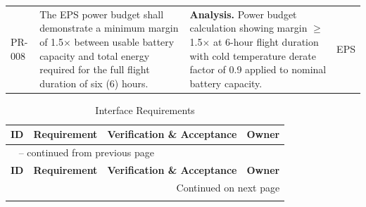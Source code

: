 \begin{landscape}
\begin{longtable}{p{1.4cm}p{8.2cm}p{10.2cm}p{1.9cm}}
PR-008 & The EPS power budget shall demonstrate a minimum margin of 1.5$\times$ between usable battery capacity and total energy required for the full flight duration of six (6) hours. & \textbf{Analysis.} Power budget calculation showing margin $\geq$1.5$\times$ at 6-hour flight duration with cold temperature derate factor of 0.9 applied to nominal battery capacity. & EPS \\
\end{longtable}

\begin{longtable}{p{1.4cm}p{8.2cm}p{10.2cm}p{1.9cm}}
\caption{Interface Requirements}
\label{tab:req-interface} \\
\toprule
\textbf{ID} & \textbf{Requirement} & \textbf{Verification \& Acceptance} & \textbf{Owner} \\
\midrule
\endfirsthead
\multicolumn{4}{l}{\tablename\ \thetable{} -- continued from previous page} \\
\toprule
\textbf{ID} & \textbf{Requirement} & \textbf{Verification \& Acceptance} & \textbf{Owner} \\
\midrule
\endhead
\midrule
\multicolumn{4}{r}{Continued on next page} \\
\endfoot
\bottomrule
\endlastfoot


\end{longtable}
\end{landscape}
